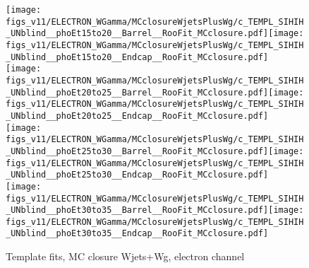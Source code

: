 \begin{figure}[htb]
  \begin{center}
   \texttt{[image: figs\_v11/ELECTRON\_WGamma/MCclosureWjetsPlusWg/c\_TEMPL\_SIHIH\_UNblind\_\_phoEt15to20\_\_Barrel\_\_RooFit\_MCclosure.pdf]}\texttt{[image: figs\_v11/ELECTRON\_WGamma/MCclosureWjetsPlusWg/c\_TEMPL\_SIHIH\_UNblind\_\_phoEt15to20\_\_Endcap\_\_RooFit\_MCclosure.pdf]}\\
   \texttt{[image: figs\_v11/ELECTRON\_WGamma/MCclosureWjetsPlusWg/c\_TEMPL\_SIHIH\_UNblind\_\_phoEt20to25\_\_Barrel\_\_RooFit\_MCclosure.pdf]}\texttt{[image: figs\_v11/ELECTRON\_WGamma/MCclosureWjetsPlusWg/c\_TEMPL\_SIHIH\_UNblind\_\_phoEt20to25\_\_Endcap\_\_RooFit\_MCclosure.pdf]}\\
   \texttt{[image: figs\_v11/ELECTRON\_WGamma/MCclosureWjetsPlusWg/c\_TEMPL\_SIHIH\_UNblind\_\_phoEt25to30\_\_Barrel\_\_RooFit\_MCclosure.pdf]}\texttt{[image: figs\_v11/ELECTRON\_WGamma/MCclosureWjetsPlusWg/c\_TEMPL\_SIHIH\_UNblind\_\_phoEt25to30\_\_Endcap\_\_RooFit\_MCclosure.pdf]}\\
   \texttt{[image: figs\_v11/ELECTRON\_WGamma/MCclosureWjetsPlusWg/c\_TEMPL\_SIHIH\_UNblind\_\_phoEt30to35\_\_Barrel\_\_RooFit\_MCclosure.pdf]}\texttt{[image: figs\_v11/ELECTRON\_WGamma/MCclosureWjetsPlusWg/c\_TEMPL\_SIHIH\_UNblind\_\_phoEt30to35\_\_Endcap\_\_RooFit\_MCclosure.pdf]}\\
  \label{fig:templateFits_MCclosureWjetsPlusWg_SIHIH_ELECTRON_1}
  \caption{Template fits, MC closure Wjets+Wg, electron channel}
  \end{center}
\end{figure}

